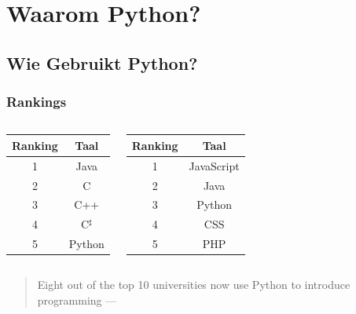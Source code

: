 \section{Waarom Python?}

\subsection{Wie Gebruikt Python?}

\frame{\tableofcontents[currentsubsection]}


\begin{frame}
  \frametitle{Rankings}
  \begin{columns}
    \column{5cm}
    \begin{center}
      \begin{tabular}{cc}
        \textbf{Ranking} & \textbf{Taal} \\
        \toprule
        1 & Java \\
        2 & C \\
        3 & C++ \\
        4 & C$^\sharp$ \\
        5 & Python \\
      \end{tabular}
      \vskip5mm
    \end{center}
    \column{5cm}
    \begin{center}
      \begin{tabular}{cc}
        \textbf{Ranking} & \textbf{Taal} \\
        \toprule
        1 & JavaScript \\
        2 & Java \\
        3 & Python \\
        4 & CSS \\
        5 & PHP \\
      \end{tabular}
      \vskip5mm
    \end{center}
  \end{columns}
  \vskip5mm
  \begin{quote}
    Eight out of the top 10 universities now use Python to introduce programming --- 
  \end{quote}
\end{frame}


